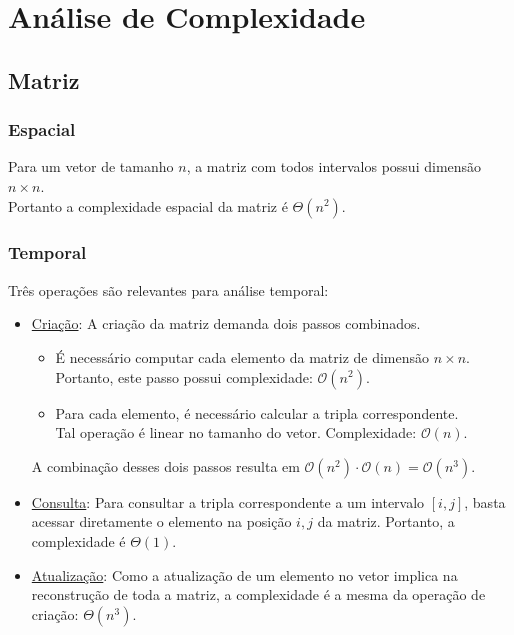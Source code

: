 \documentclass{article}
\begin{document}
\section{Análise de Complexidade}

\subsection{Matriz}
\subsubsection{Espacial}
Para um vetor de tamanho $n$, a matriz com todos intervalos possui dimensão $n \times n$. \\
Portanto a complexidade espacial da matriz é $\Theta(n^2)$.

\subsubsection{Temporal}
Três operações são relevantes para análise temporal:
\vspace{-5pt}
\begin{itemize}
  \item \uline{Criação}: A criação da matriz demanda dois passos combinados.
        \begin{itemize}
          \item É necessário computar cada elemento da matriz de dimensão $n \times n$.\\
                Portanto, este passo possui complexidade: $\mathcal{O}(n^2)$.
          \item Para cada elemento, é necessário calcular a tripla correspondente. \\
                Tal operação é linear no tamanho do vetor. Complexidade: $\mathcal{O}(n)$.
        \end{itemize}
        A combinação desses dois passos resulta em $\mathcal{O}(n^2) \cdot \mathcal{O}(n) = \mathcal{O}(n^3)$.
  
  \item \uline{Consulta}: Para consultar a tripla correspondente a um intervalo $[i, j]$, basta acessar diretamente o elemento na posição $i, j$ da matriz. Portanto, a complexidade é $\Theta(1)$.
  
  \item \uline{Atualização}: Como a atualização de um elemento no vetor implica na reconstrução de toda a matriz, a complexidade é a mesma da operação de criação: $\Theta(n^3)$.
\end{itemize}
\end{document}

